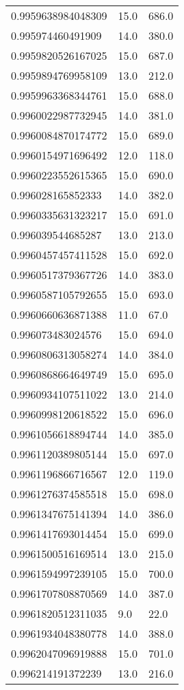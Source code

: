 \begin{center}
\begin{supertabular}[H]{p{0.30\textwidth}p{0.05\textwidth}p{0.05\textwidth}}
0.9959638984048309 & 15.0 & 686.0 \\ 
0.995974460491909 & 14.0 & 380.0 \\ 
0.9959820526167025 & 15.0 & 687.0 \\ 
0.9959894769958109 & 13.0 & 212.0 \\ 
0.9959963368344761 & 15.0 & 688.0 \\ 
0.9960022987732945 & 14.0 & 381.0 \\ 
0.9960084870174772 & 15.0 & 689.0 \\ 
0.9960154971696492 & 12.0 & 118.0 \\ 
0.9960223552615365 & 15.0 & 690.0 \\ 
0.996028165852333 & 14.0 & 382.0 \\ 
0.9960335631323217 & 15.0 & 691.0 \\ 
0.996039544685287 & 13.0 & 213.0 \\ 
0.9960457457411528 & 15.0 & 692.0 \\ 
0.9960517379367726 & 14.0 & 383.0 \\ 
0.9960587105792655 & 15.0 & 693.0 \\ 
0.9960660636871388 & 11.0 & 67.0 \\ 
0.996073483024576 & 15.0 & 694.0 \\ 
0.9960806313058274 & 14.0 & 384.0 \\ 
0.9960868664649749 & 15.0 & 695.0 \\ 
0.9960934107511022 & 13.0 & 214.0 \\ 
0.9960998120618522 & 15.0 & 696.0 \\ 
0.9961056618894744 & 14.0 & 385.0 \\ 
0.9961120389805144 & 15.0 & 697.0 \\ 
0.9961196866716567 & 12.0 & 119.0 \\ 
0.9961276374585518 & 15.0 & 698.0 \\ 
0.9961347675141394 & 14.0 & 386.0 \\ 
0.9961417693014454 & 15.0 & 699.0 \\ 
0.9961500516169514 & 13.0 & 215.0 \\ 
0.9961594997239105 & 15.0 & 700.0 \\ 
0.9961707808870569 & 14.0 & 387.0 \\ 
0.9961820512311035 & 9.0 & 22.0 \\ 
0.9961934048380778 & 14.0 & 388.0 \\ 
0.9962047096919888 & 15.0 & 701.0 \\ 
0.996214191372239 & 13.0 & 216.0 \\ 

\end{supertabular}
\end{center}
